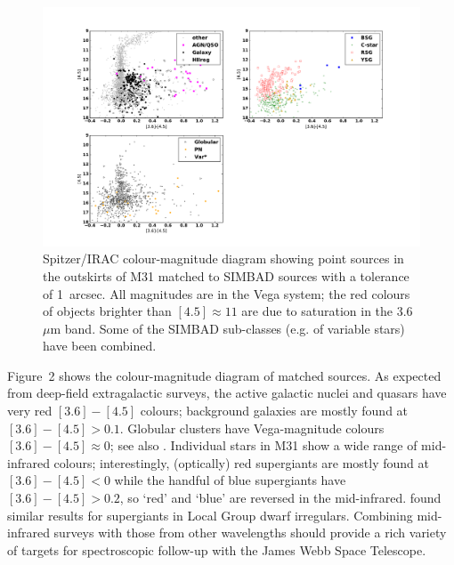 \documentclass{iau}
\begin{document}
\begin{figure}[t]
\begin{center}
 \includegraphics[width=\textwidth]{fig2_new} 
 \caption{Spitzer/IRAC colour-magnitude diagram showing point sources in the outskirts of M31 matched to SIMBAD
 sources with a tolerance of 1~arcsec. All magnitudes are in the Vega system; the red colours of objects brighter than
 $[4.5]\approx 11$ are due to saturation in the 3.6~$\mu$m band. Some of the SIMBAD sub-classes (e.g. of variable stars)
have been combined.}
   \label{fig2}
\end{center}
\end{figure}

Figure~2 shows the colour-magnitude diagram of matched sources. As expected from deep-field extragalactic surveys,
the active galactic nuclei and quasars have very red $[3.6]-[4.5]$ colours; background galaxies are mostly found at $[3.6]-[4.5]>0.1$.
Globular clusters have Vega-magnitude colours  $[3.6]-[4.5]\approx 0$; see also \cite[Barmby \& Jalilian (2012)]{bj12}.
Individual stars in M31 show a wide range of mid-infrared colours; interestingly, (optically) red supergiants are mostly found at $[3.6]-[4.5]<0$
while the handful of blue supergiants have $[3.6]-[4.5]>0.2$, so `red' and `blue' are reversed in the mid-infrared.
\cite[Britavskiy \etal\ (2015)]{brit15} found similar results for supergiants in Local Group dwarf irregulars.
Combining mid-infrared surveys with those from other wavelengths should provide a rich variety of targets for spectroscopic follow-up
with the James Webb Space Telescope.  
 
\end{document}
